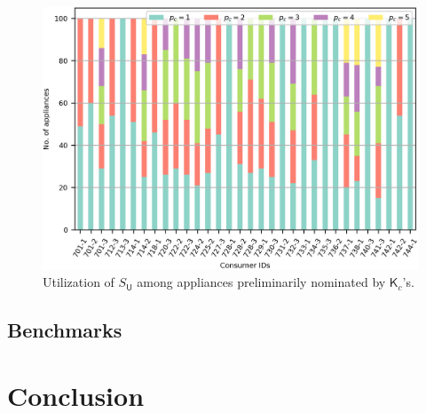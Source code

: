 \documentclass[journal, a4paper]{IEEEtran}
\begin{document}
\begin{figure}[t!]
	\centering
	\includegraphics[scale=1.0]{37NTF-C ACPL}
	\caption{Utilization of $S_{\mathsf{U}}$ among appliances preliminarily nominated by $\mathsf{K}_{c}$'s.}
\end{figure}

\subsection{Benchmarks}
\label{subsec: III. Benchmarks}

\section{Conclusion}
\label{sec: Conclusion}

\lipsum[28]





\end{document}

